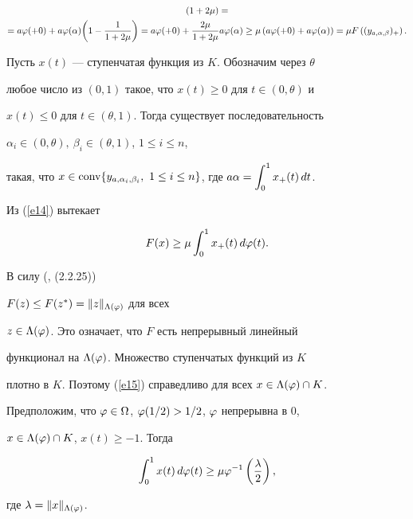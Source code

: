 \begin{pf}
\begin{multline}
{(1+ 2\mu)} = \\


%


= a\ph(+0) + a\ph(\alpha) \bigg( 1- \frac 1 {1 +2\mu}\bigg) =


a\ph (+0) + \frac {2\mu}{1+2\mu} a\ph(\alpha) \ge 


\mu \left( a\ph(+0) + a \ph(\alpha)\right) = \mu F


\left( (y_{a,\alpha, \beta})_+\right).


\end{multline}





Пусть $x(t)$ --- ступенчатая функция из $K$. Обозначим через $\theta$ 


любое число из $(0,1)$ такое, что $x(t) \ge 0$ для $t\in (0, \theta)$ и


$x(t) \le 0$ для $t\in (\theta,1)$. Тогда существует последовательность 


$\alpha_i \in (0, \theta), \ \beta_i \in (\theta, 1)$, $1\le i \le n$, 


такая, что $x\in \conv \{ y_{a,\alpha_i, \beta_i}, \ 1\le i \le 


n\}$, где $a\alpha = \intl{0}{1} x_+ (t)\, dt$.


Из (\ref{e14}) вытекает


\begin{equation}\label{e15}


F(x) \ge \mu \intl{0}{1} 


x_+ (t) \, d\ph(t). 


\end{equation}





В силу (\cite{KPS}, (2.2.25))


$F(z) \le F(z^*) = \|z\|_{\Lambda(\varphi)}$ для всех 


$z\in \Lambda (\varphi)$. Это означает, что $F$ есть непрерывный линейный 


функционал на $\Lambda (\varphi)$. Множество ступенчатых функций из $K$ 


плотно в $K$. Поэтому (\ref{e15}) справедливо для всех $x\in \Lambda (\ph)


\cap K$.


\end{pf}





\begin{lem}\label{l3}


Предположим, что $\varphi\in \Omega$, $\varphi(1/2) > 1/2$, $\varphi$ непрерывна в $0$,  


$x\in \Lambda(\varphi) \cap K$, $x(t) \ge -1$. Тогда


$$


\intl{0}{1} x(t)\, d\ph(t) \ge \mu \ph^{-1} \left(\frac \lambda 2\right), 


$$


где $\lambda = \|x\|_{\Lambda(\varphi)}$. 


\end{lem}





